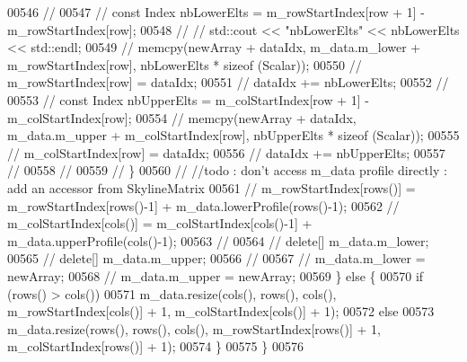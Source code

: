 \begin{DoxyCode}
00546             \textcolor{comment}{//}
00547             \textcolor{comment}{//                const Index nbLowerElts = m\_rowStartIndex[row + 1] - m\_rowStartIndex[row];}
00548             \textcolor{comment}{//                //                std::cout << "nbLowerElts" << nbLowerElts << std::endl;}
00549             \textcolor{comment}{//                memcpy(newArray + dataIdx, m\_data.m\_lower + m\_rowStartIndex[row], nbLowerElts
       * sizeof (Scalar));}
00550             \textcolor{comment}{//                m\_rowStartIndex[row] = dataIdx;}
00551             \textcolor{comment}{//                dataIdx += nbLowerElts;}
00552             \textcolor{comment}{//}
00553             \textcolor{comment}{//                const Index nbUpperElts = m\_colStartIndex[row + 1] - m\_colStartIndex[row];}
00554             \textcolor{comment}{//                memcpy(newArray + dataIdx, m\_data.m\_upper + m\_colStartIndex[row], nbUpperElts
       * sizeof (Scalar));}
00555             \textcolor{comment}{//                m\_colStartIndex[row] = dataIdx;}
00556             \textcolor{comment}{//                dataIdx += nbUpperElts;}
00557             \textcolor{comment}{//}
00558             \textcolor{comment}{//}
00559             \textcolor{comment}{//            \}}
00560             \textcolor{comment}{//            //todo : don't access m\_data profile directly : add an accessor from
       SkylineMatrix}
00561             \textcolor{comment}{//            m\_rowStartIndex[rows()] = m\_rowStartIndex[rows()-1] +
       m\_data.lowerProfile(rows()-1);}
00562             \textcolor{comment}{//            m\_colStartIndex[cols()] = m\_colStartIndex[cols()-1] +
       m\_data.upperProfile(cols()-1);}
00563             \textcolor{comment}{//}
00564             \textcolor{comment}{//            delete[] m\_data.m\_lower;}
00565             \textcolor{comment}{//            delete[] m\_data.m\_upper;}
00566             \textcolor{comment}{//}
00567             \textcolor{comment}{//            m\_data.m\_lower = newArray;}
00568             \textcolor{comment}{//            m\_data.m\_upper = newArray;}
00569         \} \textcolor{keywordflow}{else} \{
00570             \textcolor{keywordflow}{if} (rows() > cols())
00571                 m\_data.resize(cols(), rows(), cols(), m\_rowStartIndex[cols()] + 1, m\_colStartIndex[cols()] 
      + 1);
00572             \textcolor{keywordflow}{else}
00573                 m\_data.resize(rows(), rows(), cols(), m\_rowStartIndex[rows()] + 1, m\_colStartIndex[rows()] 
      + 1);
00574         \}
00575     \}
00576 

\end{DoxyCode}
